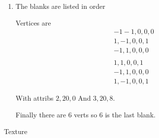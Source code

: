 \documentclass{article}
\begin{document}
\begin{enumerate}
\begin{enumerate}
\begin{mdframed}
                       Finally there are 6 verts so
                       $6$ is the last blank.
                    \end{mdframed}
                \break
                \item The blanks are listed in order
                    \begin{mdframed}
                       Vertices are 
                       \begin{gather}
                           -1 -1, 0, 0, 0\\
                           1, -1, 0, 0, 1\\
                           -1, 1, 0, 0, 0\\
                           \\
                           1, 1, 0, 0, 1\\
                           -1, 1, 0, 0, 0\\
                           1, -1, 0, 0, 1
                       \end{gather}

                       With attribs $2, 20, 0$
                       And $3, 20, 8$.

                       Finally there are 6 verts so
                       $6$ is the last blank.
                    \end{mdframed}
            \end{enumerate}
    \end{enumerate}

    \break
    {\large Texture}
\end{document}
